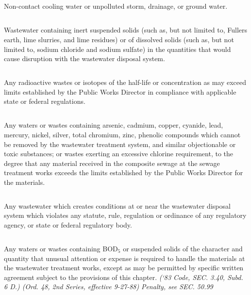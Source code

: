 \documentclass[code.tex]{subfiles}
\begin{document}
\subsection{}
Non-contact cooling water or unpolluted storm, drainage, or ground water.
\subsection{}
Wastewater containing inert suspended solids (such as, but not limited to, Fullers earth, lime slurries, and lime residues) or of dissolved solids (such as, but not limited to, sodium chloride and sodium sulfate) in the quantities that would cause disruption with the wastewater disposal system.
\subsection{}
Any radioactive wastes or isotopes of the half-life or concentration as may exceed limits established by the Public Works Director in compliance with applicable state or federal regulations.
\subsection{}
Any waters or wastes containing arsenic, cadmium, copper, cyanide, lead, mercury, nickel, silver, total chromium, zinc, phenolic compounds which cannot be removed by the wastewater treatment system, and similar objectionable or toxic substances; or wastes exerting an excessive chlorine requirement, to the degree that any material received in the composite sewage at the sewage treatment works exceeds the limits established by the Public Works Director for the materials.
\subsection{}
Any wastewater which creates conditions at or near the wastewater disposal system which violates any statute, rule, regulation or ordinance of any regulatory agency, or state or federal regulatory body.
\subsection{}
Any waters or wastes containing BOD$_{5}$ or suspended solids of the character and quantity that unusual attention or expense is required to handle the materials at the wastewater treatment works, except as may be permitted by specific written agreement subject to the provisions of this chapter.\newline
\emph{(‘83 Code, SEC. 3.40, Subd. 6 D.) (Ord. 48, 2nd Series, effective 9-27-88)}\newline
\emph{Penalty, see SEC. 50.99}
\end{document}

